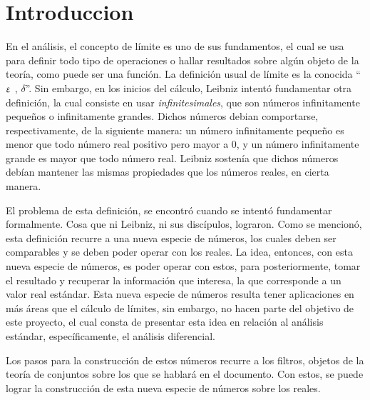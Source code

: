 \section{Introduccion}

En el análisis, el concepto de límite es uno de sus fundamentos,
el cual se usa para definir todo tipo de operaciones o hallar
resultados sobre algún objeto de la teoría, como puede ser una
función. La definición usual de límite es la conocida
``$\upvarepsilon$ , $\delta$''. Sin embargo, en los inicios del cálculo,
Leibniz intentó fundamentar otra definición, la cual consiste en
usar \emph{infinitesimales}, que son números infinitamente pequeños
o infinitamente grandes. Dichos números debian comportarse,
respectivamente, de la siguiente manera:
un número infinitamente pequeño es menor que todo número real positivo
pero mayor a $0$, y un número infinitamente grande es mayor que todo
número real. Leibniz sostenía que dichos números debían mantener las
mismas propiedades que los números reales, en cierta manera.

El problema de esta definición, se encontró cuando se intentó fundamentar
formalmente. Cosa que ni Leibniz, ni sus discípulos, lograron.
Como se mencionó, esta definición recurre a una nueva especie de números, los cuales
deben ser comparables y se deben poder operar con los reales. La idea,
entonces, con esta nueva especie de números, es poder operar con estos,
para posteriormente, tomar el resultado y recuperar la información que interesa,
la que corresponde a un valor real estándar. Esta nueva especie de números
resulta tener aplicaciones en más áreas que el cálculo de límites, sin
embargo, no hacen parte del objetivo de este proyecto, el cual consta de
presentar esta idea en relación al análisis estándar, específicamente,
el análisis diferencial.

Los pasos para la construcción de estos números recurre a los filtros,
objetos de la teoría de conjuntos sobre los que se hablará en el
documento. Con estos, se puede lograr la construcción de esta nueva especie
de números sobre los reales.
